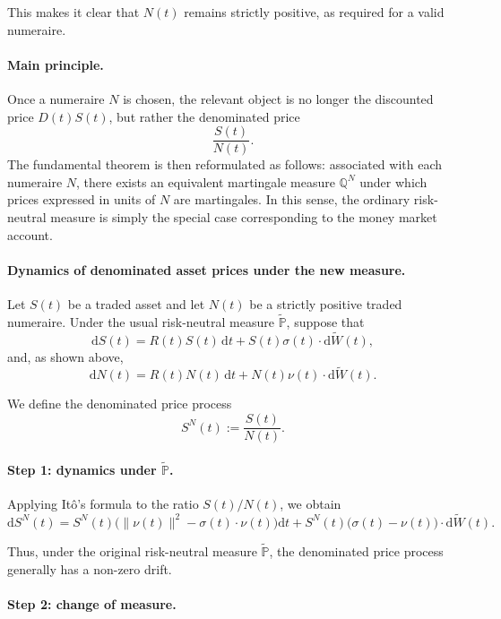 \documentclass[11pt]{article}
\newcommand{\Qbb}{\mathbb{Q}}
\theoremstyle{definition}
\theoremstyle{plain}
\begin{document}
This makes it clear that \(N(t)\) remains strictly positive, as required
for a valid numeraire.


\paragraph{Main principle.}
Once a numeraire \(N\) is chosen, the relevant object is no longer the
discounted price \(D(t)S(t)\), but rather the denominated price
\[
\frac{S(t)}{N(t)}.
\]
The fundamental theorem is then reformulated as follows: associated with
each numeraire \(N\), there exists an equivalent martingale measure
\(\Qbb^N\) under which prices expressed in units of \(N\) are
martingales. In this sense, the ordinary risk-neutral measure is simply
the special case corresponding to the money market account. 

\paragraph{Dynamics of denominated asset prices under the new measure.}

Let \(S(t)\) be a traded asset and let \(N(t)\) be a strictly positive
traded numeraire.
Under the usual risk-neutral measure \(\widetilde{\mathbb P}\), suppose
that
\[
\mathrm{d}S(t)
=
R(t)S(t)\,\mathrm{d}t
+
S(t)\sigma(t)\cdot \mathrm{d}\widetilde W(t),
\]
and, as shown above,
\[
\mathrm{d}N(t)
=
R(t)N(t)\,\mathrm{d}t
+
N(t)\nu(t)\cdot \mathrm{d}\widetilde W(t).
\]

We define the denominated price process
\[
S^N(t):=\frac{S(t)}{N(t)}.
\]

\paragraph{Step 1: dynamics under \(\widetilde{\mathbb P}\).}

Applying It\^o's formula to the ratio \(S(t)/N(t)\), we obtain
\[
\mathrm{d}S^N(t)
=
S^N(t)
\Big(
\|\nu(t)\|^2-\sigma(t)\cdot\nu(t)
\Big)\mathrm{d}t
+
S^N(t)\big(\sigma(t)-\nu(t)\big)\cdot \mathrm{d}\widetilde W(t).
\]

Thus, under the original risk-neutral measure
\(\widetilde{\mathbb P}\), the denominated price process generally has
a non-zero drift.

\paragraph{Step 2: change of measure.}
\end{document}
